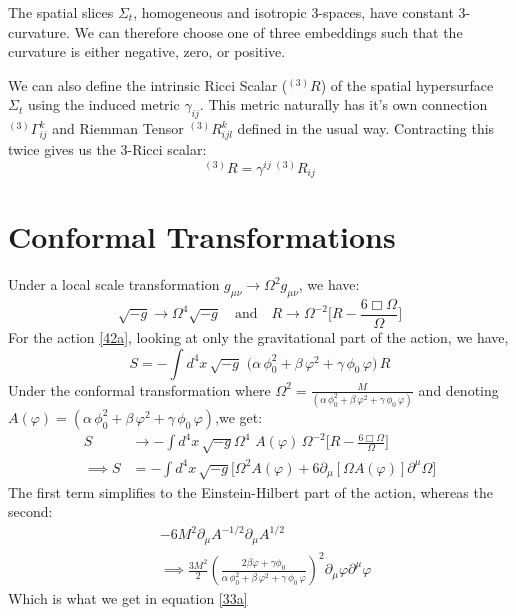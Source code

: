 \documentclass[aps,prd,reprint,preprintnumbers,showpacs,floatfix,nofootinbib,superscript address]{revtex4-2}
\begin{document}

The spatial slices $\Sigma_t$, homogeneous and isotropic 3-spaces, have constant 3-curvature. We can therefore choose one of three embeddings such that the curvature is either negative, zero, or positive. 

We can also define the intrinsic Ricci Scalar (${}^{(3)}R$) of the spatial hypersurface $\Sigma_t$ using the induced metric $\gamma_{ij}$. This metric naturally has it's own connection ${}^{(3)}\Gamma_{ij}^k$ and Riemman Tensor ${}^{(3)}R_{ijl}^k$ defined in the usual way. Contracting this twice gives us the 3-Ricci scalar:
\begin{equation}
    {}^{(3)}R = \gamma^{ij} \,{}^{(3)}R_{ij}
\end{equation}


\section{Conformal Transformations} \label{Conformal Transformations}

Under a local scale transformation $g_{\mu\nu} \rightarrow \Omega^2 g_{\mu\nu} $, we have:
\[
 \sqrt{-g} \rightarrow \Omega^{4} \sqrt{-g} \quad\text{and}\quad R\rightarrow\Omega^{-2}\Big[R-\frac{6\Box\Omega}{\Omega} \Big]
\]
For the action \ref{42a}, looking at only the gravitational part of the action, we have,
\begin{equation}
    S = -\int d^4x\,\sqrt{-g}\, 
  \,\bigl(\alpha\,\phi_0^2 + \beta\,\varphi^2 + \gamma\,\phi_0\,\varphi\bigr)\,R
\end{equation}
Under the conformal transformation where $ \Omega^2 = \frac{M}{(\alpha\,\phi_0^2+\beta\,\varphi^2+\gamma\,\phi_0\,\varphi)}$ and denoting $A(\varphi) = (\alpha\,\phi_0^2+\beta\,\varphi^2+\gamma\,\phi_0\,\varphi)$,we get:
\begin{align}
    S &\rightarrow -\int d^4x\,\sqrt{-g} \Omega^{4}\, 
  \,A(\varphi)\, \Omega^{-2}\Big[R-\frac{6\Box\Omega}{\Omega} \Big] \nonumber \\
  \implies S &= - \int d^4x\,\sqrt{-g} \Big[ \Omega^2 A(\varphi) + 6 \partial_\mu[\Omega A(\varphi)] \partial^\mu\Omega \Big]
\end{align}
The first term simplifies to the Einstein-Hilbert part of the action, whereas the second:
\begin{align}
    &-6M^2 \partial_\mu A^{-1/2} \partial_\mu A^{1/2} \nonumber \\
    &\implies \frac{3M^2}{2} \left( \frac{2\beta \varphi + \gamma\phi_0}{\alpha\,\phi_0^2+\beta\,\varphi^2+\gamma\,\phi_0\,\varphi} \right)^2 \partial_\mu \varphi \partial^\mu \varphi
\end{align}
Which is what we get in equation \ref{33a}
\end{document}
